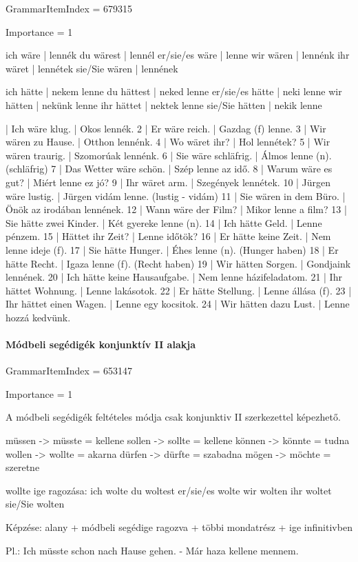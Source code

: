 \documentclass{article}
\newenvironment{desc}{\verbatim}{\endverbatim}
\newenvironment{exmp}{\verbatim}{\endverbatim}
\begin{document}
GrammarItemIndex = 679315

Importance = 1

\begin{desc}
ich wäre       | lennék
du wärest      | lennél
er/sie/es wäre | lenne
wir wären      | lennénk
ihr wäret      | lennétek
sie/Sie wären  | lennének

ich hätte       | nekem lenne
du hättest      | neked lenne
er/sie/es hätte | neki lenne
wir hätten      | nekünk lenne
ihr hättet      | nektek lenne
sie/Sie hätten  | nekik lenne
\end{desc}

\begin{exmp}
1 | Ich wäre klug. | Okos lennék.
2 | Er wäre reich. | Gazdag (f) lenne.
3 | Wir wären zu Hause. | Otthon lennénk.
4 | Wo wäret ihr? | Hol lennétek?
5 | Wir wären traurig. | Szomorúak lennénk.
6 | Sie wäre schläfrig. | Álmos lenne (n). (schläfrig)
7 | Das Wetter wäre schön. | Szép lenne az idő.
8 | Warum wäre es gut? | Miért lenne ez jó?
9 | Ihr wäret arm. | Szegények lennétek.
10 | Jürgen wäre lustig. | Jürgen vidám lenne. (lustig - vidám)
11 | Sie wären in dem Büro. | Önök az irodában lennének.
12 | Wann wäre der Film? | Mikor lenne a film?
13 | Sie hätte zwei Kinder. | Két gyereke lenne (n).
14 | Ich hätte Geld. | Lenne pénzem.
15 | Hättet ihr Zeit? | Lenne időtök?
16 | Er hätte keine Zeit. | Nem lenne ideje (f).
17 | Sie hätte Hunger. | Éhes lenne (n). (Hunger haben)
18 | Er hätte Recht. | Igaza lenne (f). (Recht haben)
19 | Wir hätten Sorgen. | Gondjaink lennének.
20 | Ich hätte keine Hausaufgabe. | Nem lenne házifeladatom.
21 | Ihr hättet Wohnung. | Lenne lakásotok.
22 | Er hätte Stellung. | Lenne állása (f).
23 | Ihr hättet einen Wagen. | Lenne egy kocsitok.
24 | Wir hätten dazu Lust. | Lenne hozzá kedvünk.
\end{exmp}

\paragraph{Módbeli segédigék konjunktív II alakja}

GrammarItemIndex = 653147

Importance = 1

\begin{desc}
A módbeli segédigék feltételes módja csak konjunktiv II szerkezettel képezhető.

müssen -> müsste = kellene
sollen -> sollte = kellene
können -> könnte = tudna
wollen -> wollte = akarna
dürfen -> dürfte = szabadna
mögen -> möchte = szeretne

wollte ige ragozása:
ich wolte
du woltest
er/sie/es wolte
wir wolten
ihr woltet
sie/Sie wolten

Képzése: alany + módbeli segédige ragozva + többi mondatrész + ige infinitivben

Pl.: Ich müsste schon nach Hause gehen. - Már haza kellene mennem.
\end{desc}
\end{document}
